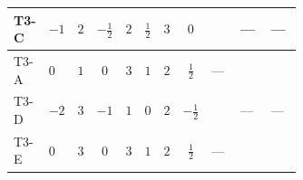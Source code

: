\documentclass[8pt]{article}
\begin{document}
\begin{landscape}
\begin{longtable}{@{}llcccccc >{\raggedright\arraybackslash}p{0.21\linewidth} >{\raggedright\arraybackslash}p{0.21\linewidth} >{\raggedright\arraybackslash}p{0.21\linewidth}@{}}
\midrule
T3-C & $-1$ & $2$ & $-\frac{1}{2}$ & $2$ & $\frac{1}{2}$ & $3$ & $0$ & \scriptsize\adjustbox{max width=\linewidth}{$\begin{gathered} +6 {\lambda_{S_2}} {m_{S_2}^2}\end{gathered}$} & --- & --- \\
\midrule
T3-A & $0$ & $1$ & $0$ & $3$ & $1$ & $2$ & $\frac{1}{2}$ & --- & \scriptsize\adjustbox{max width=\linewidth}{$\begin{gathered} -12 {g_2}^2 {m_{S_2}^2}\end{gathered}$} & \scriptsize\adjustbox{max width=\linewidth}{$\begin{gathered} -6 {g_Y}^2 {m_{S_2}^2}\end{gathered}$} \\
\midrule
T3-D & $-2$ & $3$ & $-1$ & $1$ & $0$ & $2$ & $-\frac{1}{2}$ & \scriptsize\adjustbox{max width=\linewidth}{$\begin{gathered} +4 {\lambda_{S_2}} {m_{S_2}^2}\end{gathered}$} & --- & --- \\
\midrule
T3-E & $0$ & $3$ & $0$ & $3$ & $1$ & $2$ & $\frac{1}{2}$ & --- & \scriptsize\adjustbox{max width=\linewidth}{$\begin{gathered} -12 {g_2}^2 {m_{S_2}^2}\end{gathered}$} & \scriptsize\adjustbox{max width=\linewidth}{$\begin{gathered} -6 {g_Y}^2 {m_{S_2}^2}\end{gathered}$} \\
\midrule
\bottomrule
\end{longtable}
\clearpage

\end{landscape}
\end{document}
